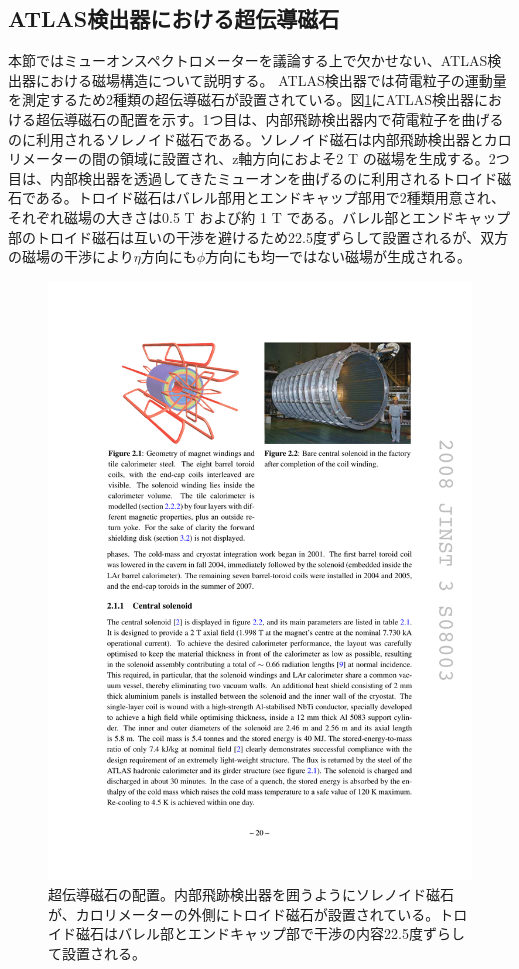 \subsection{ATLAS検出器における超伝導磁石}
\label{subsec_magnet}
本節ではミューオンスペクトロメーターを議論する上で欠かせない、ATLAS検出器における磁場構造について説明する。
ATLAS検出器では荷電粒子の運動量を測定するため2種類の超伝導磁石が設置されている。図\ref{ATLASmagnet}にATLAS検出器における超伝導磁石の配置を示す。1つ目は、内部飛跡検出器内で荷電粒子を曲げるのに利用されるソレノイド磁石である。ソレノイド磁石は内部飛跡検出器とカロリメーターの間の領域に設置され、z軸方向におよそ2 T の磁場を生成する。2つ目は、内部検出器を透過してきたミューオンを曲げるのに利用されるトロイド磁石である。トロイド磁石はバレル部用とエンドキャップ部用で2種類用意され、それぞれ磁場の大きさは0.5 T および約 1 T である。バレル部とエンドキャップ部のトロイド磁石は互いの干渉を避けるため22.5度ずらして設置されるが、双方の磁場の干渉により$\eta$方向にも$\phi$方向にも均一ではない磁場が生成される。

\begin{figure} 
    \centering
    \includegraphics[width=16cm]{fig/Intro/ATLASmagnet.pdf}
    \caption[超伝導磁石の配置]{超伝導磁石の配置\cite{JINST:2008}。内部飛跡検出器を囲うようにソレノイド磁石が、カロリメーターの外側にトロイド磁石が設置されている。トロイド磁石はバレル部とエンドキャップ部で干渉の内容22.5度ずらして設置される。}
    \label{ATLASmagnet}
\end{figure}

